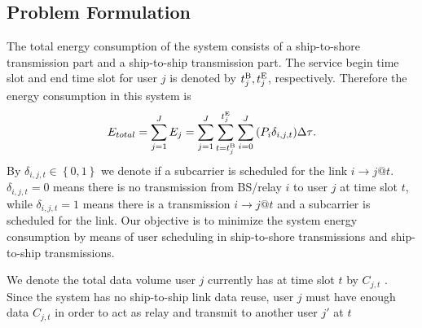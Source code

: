 \documentclass[conference]{IEEEtran}
\begin{document}
\subsection{Problem Formulation}

The total energy consumption of the system consists of a ship-to-shore transmission part and a ship-to-ship transmission part. The service begin time slot and end time slot for user $j$ is denoted by $t_j^{{\rm{B}}},t_j^{{\rm{E}}}$, respectively. Therefore the energy consumption in this system is
\begin{align}
  {{E_{total}} = \sum\limits_{j = 1}^J {{E_j}}  = \sum\limits_{j = 1}^J { {\sum\limits_{t = t_j^{{\rm{B}}}}^{t_j^{{\rm{E}}}} {\sum\limits_{i = 0}^J {\left({P_{i}}\delta _{i,j,t}  \right)} } }}\Delta \tau  }. 
  \end{align}
By $\delta _{i,j,t} \in \left\{ {0,1} \right\}$ we denote if a subcarrier is scheduled for the link $i \to j @ t$. $ {{\delta _{i,j,t}}}  = 0$ means there is no transmission from BS/relay $i$ to user $j$ at time slot $t$, while $ {{\delta _{i,j,t}}} = 1$ means there is a transmission $i \to j @ t$ and a subcarrier is scheduled for the link. 
Our objective is to minimize the system energy consumption by means of user scheduling in ship-to-shore transmissions and ship-to-ship transmissions. 


We denote the total data volume user $j$ currently has at time slot $t$ by ${C_{j,t}}$ . Since the system has no ship-to-ship link data reuse, user $j$ must have enough data ${C_{j,t}}$ in order to act as relay and transmit to another user $j'$ at $t$
\end{document}
